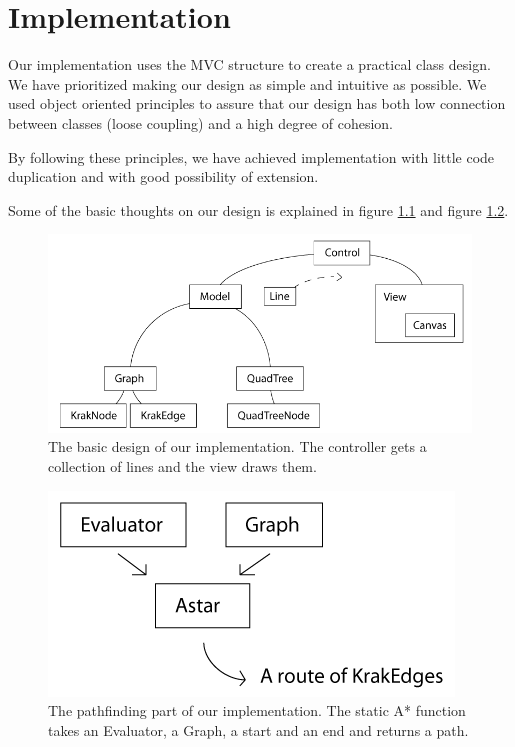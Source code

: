 \chapter{Implementation}
\label{IMPL}
Our implementation uses the MVC structure to create a practical class design. We
have prioritized making our design as simple and intuitive as possible. We used
object oriented principles to assure that our design has both low connection
between classes (loose coupling) and a high degree of cohesion.

By following these principles, we have achieved implementation with little code
duplication and with good possibility of extension.

Some of the basic thoughts on our design is explained in figure
\ref{fig:BasicDesign} and figure \ref{fig:PathfindingStructure}.

\begin{figure}[h!]
\centering
\includegraphics[width=1\linewidth]{images/BasicDesign}
\caption{The basic design of our implementation. The controller gets a
collection of lines and the view draws them.}
\label{fig:BasicDesign}
\end{figure}

\begin{figure}[h!]
\centering
\includegraphics[width=0.5\linewidth]{images/PathfindingStructure}
\caption{The pathfinding part of our implementation. The static A* function
takes an Evaluator, a Graph, a start  and an end  and
returns a path.}
\label{fig:PathfindingStructure}
\end{figure}

